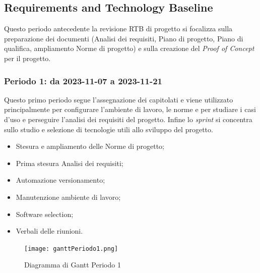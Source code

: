 \documentclass[10pt, a4paper]{article}
\begin{document}
{{{{{{{{\subsection{Requirements and Technology Baseline}
Questo periodo antecedente la revisione RTB di progetto si focalizza sulla preparazione dei documenti (Analisi dei requisiti, Piano di progetto, Piano di qualifica, ampliamento Norme di progetto) e sulla creazione del \textit{Proof of Concept} per il progetto.
\subsubsection{Periodo 1: da 2023-11-07 a 2023-11-21}
Questo primo periodo segue l'assegnazione dei capitolati e viene utilizzato principalmente per configurare l'ambiente di lavoro, le norme e per studiare i casi d'uso e perseguire l'analisi dei requisiti del progetto. Infine lo \textit{sprint} si concentra sullo studio e selezione di tecnologie utili allo sviluppo del progetto.
\begin{itemize}
    \item Stesura e ampliamento delle Norme di progetto;
    \item Prima stesura Analisi dei requisiti;
    \item Automazione versionamento;
    \item Manutenzione ambiente di lavoro;
    \item Software selection;
    \item Verbali delle riunioni.
        
\end{itemize}
\vspace{1em}

 \begin{figure}[H]
        \centering        
        \texttt{[image: ganttPeriodo1.png]}
        \caption{Diagramma di Gantt Periodo 1 }
    \end{figure}

}}}}}}}}
\end{document}

